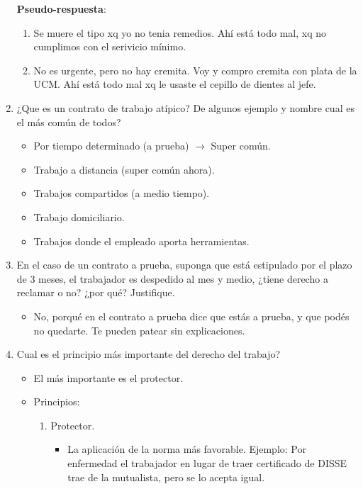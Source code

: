 \documentclass[spanish,12pt,a4paper,titlepage]{report}
\begin{document}
\begin{enumerate}
\textbf{Pseudo-respuesta}:
  \begin{enumerate}
  \item Se muere el tipo xq yo no tenia remedios. Ahí está todo mal, xq no cumplimos con el serivicio mínimo.
  \item No es urgente, pero no hay cremita. Voy y compro cremita con plata de la UCM. Ahí está todo mal xq le usaste el cepillo de dientes al jefe.
  \end{enumerate}
\item ¿Que es un contrato de trabajo atípico? De algunos ejemplo y nombre cual es el más común de todos?
  \begin{itemize}
  \item Por tiempo determinado (a prueba) $\rightarrow$ Super común.
  \item Trabajo a distancia (super común ahora).
  \item Trabajos compartidos (a medio tiempo).
  \item Trabajo domiciliario.
  \item Trabajos donde el empleado aporta herramientas.
  \end{itemize}
\item En el caso de un contrato a prueba, suponga que está estipulado por el plazo de 3 meses, el trabajador es despedido al mes y medio, ¿tiene derecho a reclamar o no? ¿por qué? Justifique.
  \begin{itemize}
  \item No, porqué en el contrato a prueba dice que estás a prueba, y que podés no quedarte. Te pueden patear sin explicaciones.
  \end{itemize}
\item Cual es el principio más importante del derecho del trabajo?
  \begin{itemize}
  \item El más importante es el protector.
  \item Principios:
    \begin{enumerate}
    \item Protector.
      \begin{itemize}
      \item La aplicación de la norma más favorable. Ejemplo: Por enfermedad el trabajador en lugar de traer certificado de DISSE trae de la mutualista, pero se lo acepta igual.

\end{itemize}
\end{enumerate}
\end{itemize}
\end{enumerate}
\end{document}

